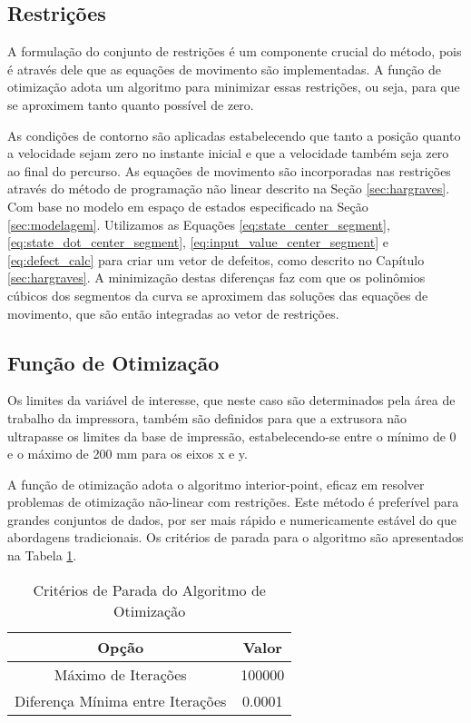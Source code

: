 \subsection{Restrições}

A formulação do conjunto de restrições é um componente crucial do método, pois é através dele que as equações de movimento são implementadas. A função de otimização adota um algoritmo para minimizar essas restrições, ou seja, para que se aproximem tanto quanto possível de zero.

As condições de contorno são aplicadas estabelecendo que tanto a posição quanto a velocidade sejam zero no instante inicial e que a velocidade também seja zero ao final do percurso. As equações de movimento são incorporadas nas restrições através do método de programação não linear descrito na Seção \ref{sec:hargraves}. Com base no modelo em espaço de estados especificado na Seção \ref{sec:modelagem}. Utilizamos as Equações \ref{eq:state_center_segment}, \ref{eq:state_dot_center_segment}, \ref{eq:input_value_center_segment} e \ref{eq:defect_calc} para criar um vetor de defeitos, como descrito no Capítulo \ref{sec:hargraves}. A minimização destas diferenças faz com que os polinômios cúbicos dos segmentos da curva se aproximem das soluções das equações de movimento, que são então integradas ao vetor de restrições.

\subsection{Função de Otimização}

Os limites da variável de interesse, que neste caso são determinados pela área de trabalho da impressora, também são definidos para que a extrusora não ultrapasse os limites da base de impressão, estabelecendo-se entre o mínimo de 0 e o máximo de 200 mm para os eixos x e y.

A função de otimização adota o algoritmo interior-point, eficaz em resolver problemas de otimização não-linear com restrições. Este método é preferível para grandes conjuntos de dados, por ser mais rápido e numericamente estável do que abordagens tradicionais. Os critérios de parada para o algoritmo são apresentados na Tabela \ref{tab:stop_crit}.

\begin{table}[H]
    \centering
    \caption{Critérios de Parada do Algoritmo de Otimização}
    \label{tab:stop_crit}
    \begin{tabular}{c c}
        Opção & Valor \\ \hline
        Máximo de Iterações & 100000 \\
        Diferença Mínima entre Iterações & 0.0001 \\ \hline
    \end{tabular}
\end{table}
